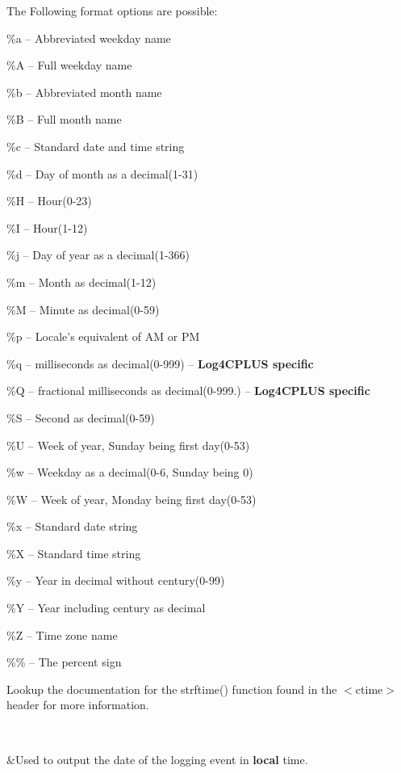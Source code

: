 \begin{TabularC}{2}
The Following format options are possible\-: 
\begin{DoxyItemize}
\item \%a -- Abbreviated weekday name 
\item \%A -- Full weekday name 
\item \%b -- Abbreviated month name 
\item \%B -- Full month name 
\item \%c -- Standard date and time string 
\item \%d -- Day of month as a decimal(1-\/31) 
\item \%H -- Hour(0-\/23) 
\item \%I -- Hour(1-\/12) 
\item \%j -- Day of year as a decimal(1-\/366) 
\item \%m -- Month as decimal(1-\/12) 
\item \%M -- Minute as decimal(0-\/59) 
\item \%p -- Locale's equivalent of A\-M or P\-M 
\item \%q -- milliseconds as decimal(0-\/999) -- {\bfseries Log4\-C\-P\-L\-U\-S specific} 
\item \%Q -- fractional milliseconds as decimal(0-\/999.) -- {\bfseries Log4\-C\-P\-L\-U\-S specific} 
\item \%S -- Second as decimal(0-\/59) 
\item \%U -- Week of year, Sunday being first day(0-\/53) 
\item \%w -- Weekday as a decimal(0-\/6, Sunday being 0) 
\item \%W -- Week of year, Monday being first day(0-\/53) 
\item \%x -- Standard date string 
\item \%X -- Standard time string 
\item \%y -- Year in decimal without century(0-\/99) 
\item \%Y -- Year including century as decimal 
\item \%Z -- Time zone name 
\item \%\% -- The percent sign 
\end{DoxyItemize}

Lookup the documentation for the {\ttfamily strftime()} function found in the {\ttfamily $<$ctime$>$} header for more information.  

\\
\PBS{}

&Used to output the date of the logging event in {\bfseries local} time.


\end{TabularC}
